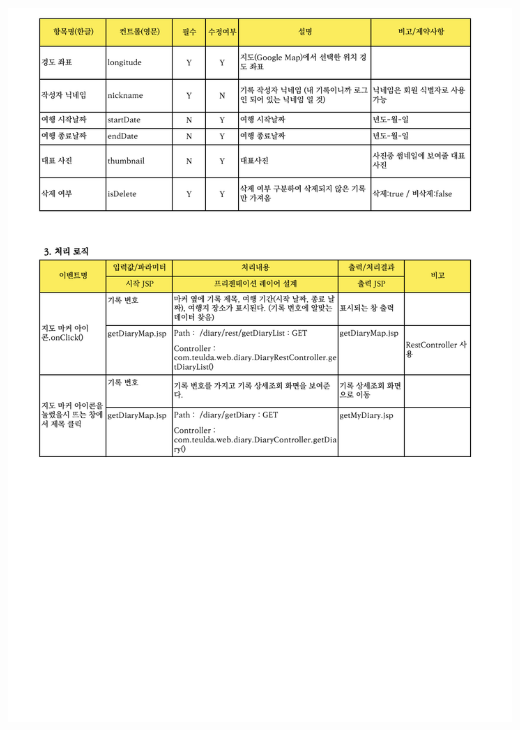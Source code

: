 {{{{{{{{{{{{{{{{{{{{{{{{{{{{{{{{\includegraphics[width=20cm]{./Figure/Design/Display/diary/diary_14.pdf} \\
}}}}}}}}}}}}}}}}}}}}}}}}}}}}}}}}
